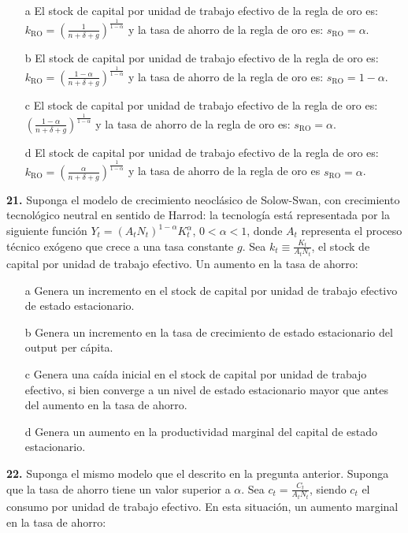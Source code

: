 \documentclass{nuevotema}
\begin{document}
\begin{itemize}
	\item[a] El stock de capital por unidad de trabajo  efectivo de la regla de oro es: $k_\text{RO} = \left( \frac{1}{n+\delta+g} \right)^\frac{1}{1-\alpha}$ y la tasa de ahorro de la regla de oro es: $s_\text{RO} = \alpha$.
	\item[b] El stock de capital por unidad de trabajo efectivo de la regla de oro es: $k_\text{RO} = \left( \frac{1-\alpha}{n+\delta+g} \right)^\frac{1}{1-\alpha}$  y la tasa de ahorro de la regla de oro es: $s_\text{RO} = 1-\alpha$.
	\item[c] El stock de capital por unidad de trabajo efectivo de la regla de oro es: $\left(  \frac{1-\alpha}{n+\delta+g} \right)^\frac{1}{1-\alpha}$ y la tasa de ahorro de la regla de oro es: $s_\text{RO} = \alpha$.
	\item[d] El stock de capital por unidad de trabajo efectivo de la regla de oro es: $k_\text{RO} = \left( \frac{\alpha}{n+\delta+g} \right)^\frac{1}{1-\alpha} $ y la tasa de ahorro de la regla de oro es $s_\text{RO} = \alpha$.
\end{itemize}


\textbf{21.} Suponga el modelo de crecimiento neoclásico de Solow-Swan, con crecimiento tecnológico neutral en sentido de Harrod: la tecnología está representada por la siguiente función $Y_t = \left( A_t N_t \right)^{1-\alpha} K_t^\alpha$, $0<\alpha<1$, donde $A_t$ representa el proceso técnico exógeno que crece a una tasa constante $g$. Sea $k_t \equiv \frac{K_t}{A_t N_t}$, el stock de capital por unidad de trabajo efectivo. Un aumento en la tasa de ahorro:

\begin{itemize}
	\item[a] Genera un incremento en el stock de capital por unidad de trabajo efectivo de estado estacionario.
	\item[b] Genera un incremento en la tasa de crecimiento de estado estacionario del output per cápita. 
	\item[c] Genera una caída inicial en el stock de capital por unidad de trabajo efectivo, si bien converge a un nivel de estado estacionario mayor que antes del aumento en la tasa de ahorro.
	\item[d] Genera un aumento en la productividad marginal del capital de estado estacionario.
\end{itemize}

\textbf{22.} Suponga el mismo modelo que el descrito en la pregunta anterior. Suponga que la tasa de ahorro tiene un valor superior a $\alpha$. Sea $c_t = \frac{C_t}{A_t N_t}$, siendo $c_t$ el consumo por unidad de trabajo efectivo. En esta situación, un aumento marginal en la tasa de ahorro:
\end{document}
